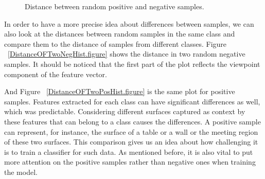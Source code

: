 



\begin{figure}[t]
  \caption[Distance of Positive and Negative samples]
  {Distance between random positive and negative samples.}
  \label{DistanceOFPosandNegHist.figure}
\end{figure}

In order to have a more precise idea about differences between samples, we can also look at the distances between random samples
in the same class and compare them to the distance of samples from different classes. 
Figure ~\ref{DistanceOFTwoNegHist.figure} shows the distance in two random negative samples. 
It should be noticed that the first part of the plot reflects the viewpoint component of the feature vector.
 


And Figure ~\ref{DistanceOFTwoPosHist.figure} is the same plot for positive samples. 
Features extracted for each class can have significant differences as well, which was predictable. 
Considering different surfaces captured as context by these features that can belong to a class causes the differences. 
A positive sample can represent, for instance, the surface of a table or a wall or the meeting region of these 
two surfaces. 
This comparison gives us an idea about how challenging it is to train a classifier for such data.
As mentioned before, it is also vital to put more attention on the positive samples rather than negative ones when training the model. 



